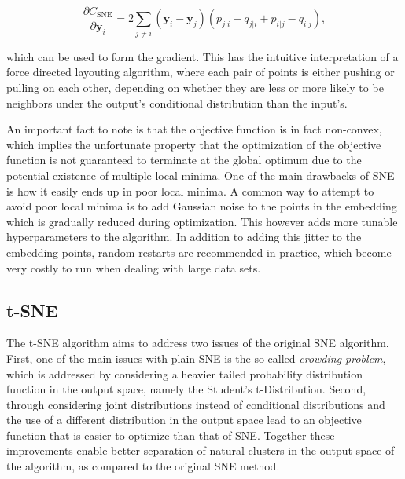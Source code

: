 \begin{equation}
\frac{\partial C_{\text{SNE}}}{\partial \mathbf{y}_i} = 2 \sum_{j \neq i} (\mathbf{y}_i - \mathbf{y}_j)(p_{j \vert i} - q_{j \vert i} + p_{i \vert j} - q_{i \vert j}),
\label{eq:c_sne_grad}
\end{equation}

which can be used to form the gradient. This has the intuitive interpretation of a force directed layouting algorithm, where each pair of points is either pushing or pulling on each other, depending on whether they are less or more likely to be neighbors under the output's conditional distribution than the input's.

An important fact to note is that the objective function is in fact non-convex, which implies the unfortunate property that the optimization of the objective function is not guaranteed to terminate at the global optimum due to the potential existence of multiple local minima. One of the main drawbacks of SNE is how it easily ends up in poor local minima. A common way to attempt to avoid poor local minima is to add Gaussian noise to the points in the embedding which is gradually reduced during optimization. This however adds more tunable hyperparameters to the algorithm. In addition to adding this jitter to the embedding points, random restarts are recommended in practice, which become very costly to run when dealing with large data sets.

\subsection{t-SNE}
\label{subsection:tsne}

The t-SNE algorithm aims to address two issues of the original SNE algorithm. First, one of the main issues with plain SNE is the so-called \textit{crowding problem}, which is addressed by considering a heavier tailed probability distribution function in the output space, namely the Student's t-Distribution. Second, through considering joint distributions instead of conditional distributions and the use of a different distribution in the output space lead to an objective function that is easier to optimize than that of SNE. Together these improvements enable better separation of natural clusters in the output space of the algorithm, as compared to the original SNE method.

